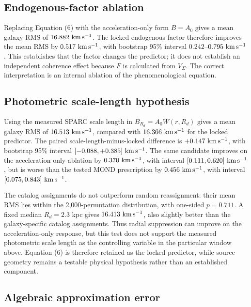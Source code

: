 \documentclass[utf8]{FrontiersinHarvard}
\begin{document}
\subsection{Endogenous-factor ablation}\label{endogenous-factor-ablation}

Replacing Equation (6) with the acceleration-only form \(B=A_0\) gives a mean galaxy RMS of \(16.882\ {\rm km\,s^{-1}}\). The locked endogenous factor therefore improves the mean RMS by \(0.517\ {\rm km\,s^{-1}}\), with bootstrap 95\% interval \(0.242\)--\(0.795\ {\rm km\,s^{-1}}\). This establishes that the factor changes the predictor; it does not establish an independent coherence effect because \(F\) is calculated from \(V_\Sigma\). The correct interpretation is an internal ablation of the phenomenological equation.

\subsection{Photometric scale-length hypothesis}\label{photometric-scale-length-hypothesis}

Using the measured SPARC scale length in \(B_{R_d}=A_0W(r,R_d)\) gives a mean galaxy RMS of \(16.513\ {\rm km\,s^{-1}}\), compared with \(16.366\ {\rm km\,s^{-1}}\) for the locked predictor. The paired scale-length-minus-locked difference is \(+0.147\ {\rm km\,s^{-1}}\), with bootstrap 95\% interval \([-0.088,+0.385]\ {\rm km\,s^{-1}}\). The same candidate improves on the acceleration-only ablation by \(0.370\ {\rm km\,s^{-1}}\), with interval \([0.111,0.620]\ {\rm km\,s^{-1}}\), but is worse than the tested MOND prescription by \(0.456\ {\rm km\,s^{-1}}\), with interval \([0.075,0.843]\ {\rm km\,s^{-1}}\).

The catalog assignments do not outperform random reassignment: their mean RMS lies within the 2,000-permutation distribution, with one-sided \(p=0.711\). A fixed median \(R_d=2.3\) kpc gives \(16.413\ {\rm km\,s^{-1}}\), also slightly better than the galaxy-specific catalog assignments. Thus radial suppression can improve on the acceleration-only response, but this test does not support the measured photometric scale length as the controlling variable in the particular window above. Equation (6) is therefore retained as the locked predictor, while source geometry remains a testable physical hypothesis rather than an established component.

\subsection{Algebraic approximation error}\label{algebraic-approximation-error}
\end{document}
